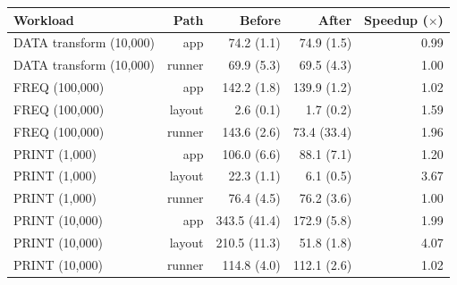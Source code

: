 \begin{tabular}{lrrrr}
\toprule
Workload & Path & Before & After & Speedup ($\times$) \\
\midrule
DATA transform (10,000) & app & 74.2 (1.1) & 74.9 (1.5) & 0.99 \\
DATA transform (10,000) & runner & 69.9 (5.3) & 69.5 (4.3) & 1.00 \\
FREQ (100,000) & app & 142.2 (1.8) & 139.9 (1.2) & 1.02 \\
FREQ (100,000) & layout & 2.6 (0.1) & 1.7 (0.2) & 1.59 \\
FREQ (100,000) & runner & 143.6 (2.6) & 73.4 (33.4) & 1.96 \\
PRINT (1,000) & app & 106.0 (6.6) & 88.1 (7.1) & 1.20 \\
PRINT (1,000) & layout & 22.3 (1.1) & 6.1 (0.5) & 3.67 \\
PRINT (1,000) & runner & 76.4 (4.5) & 76.2 (3.6) & 1.00 \\
PRINT (10,000) & app & 343.5 (41.4) & 172.9 (5.8) & 1.99 \\
PRINT (10,000) & layout & 210.5 (11.3) & 51.8 (1.8) & 4.07 \\
PRINT (10,000) & runner & 114.8 (4.0) & 112.1 (2.6) & 1.02 \\
\bottomrule
\end{tabular}
